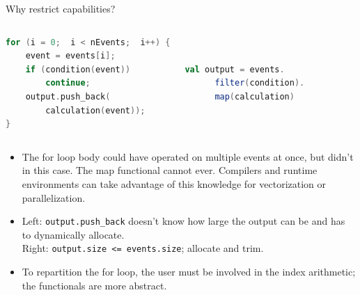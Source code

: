 \documentclass{beamer}
\begin{document}
\begin{frame}[fragile]{Why restrict capabilities?}
\vspace{0.5 cm}
\begin{columns}
\begin{lstlisting}[language=c, basicstyle=\ttfamily\scriptsize]
for (i = 0;  i < nEvents;  i++) {
    event = events[i];
    if (condition(event))
        continue;
    output.push_back(
        calculation(event));
}
\end{lstlisting}

\begin{lstlisting}[language=scala, basicstyle=\ttfamily\scriptsize]


val output = events.
      filter(condition).
      map(calculation)


\end{lstlisting}
\end{columns}

\begin{itemize}
\item The for loop body could have operated on multiple events at once, but didn't in this case. The map functional cannot ever. Compilers and runtime environments can take advantage of this knowledge for vectorization or parallelization.

\item<2-> Left: {\small\tt output.push\_back} doesn't know how large the output can be and has to dynamically allocate. \\ Right: {\small\tt output.size <= events.size}; allocate and trim.

\item<3-> To repartition the for loop, the user must be involved in the index arithmetic; the functionals are more abstract.
\end{itemize}
\end{frame}
\end{document}
